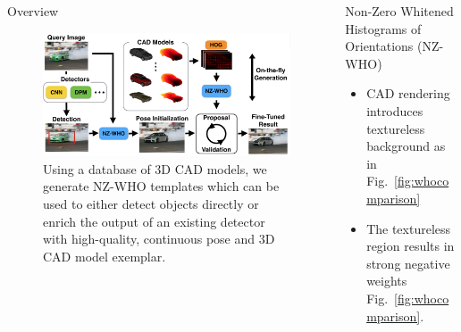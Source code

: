 \documentclass[serif,mathserif,final]{beamer}
\newcommand{\1}{\mathbb{I}} %
\begin{document}
\begin{frame}{}
\begin{columns}[t]
\begin{column}{0.24\linewidth}
      \begin{block}{Overview}
        \begin{figure}[t]
          \centering
          \includegraphics[width=0.95\linewidth]{front} %
          \caption{\normalfont Using a database of 3D CAD models, we generate NZ-WHO
            templates which can be used to either detect objects directly or
            enrich the output of an existing detector with high-quality,
            continuous pose and 3D CAD model exemplar.}
          \label{fig:front}
        \end{figure}

      \end{block}


    \end{column}%



    \begin{column}{0.24\linewidth}


      \begin{block}{Non-Zero Whitened Histograms of Orientations (NZ-WHO)}
        \vspace{-1.0em}
        \begin{itemize}
          \item CAD rendering introduces textureless background as in
            Fig.~\ref{fig:whocomparison}
          \item The textureless region results in strong negative
            weights Fig.~\ref{fig:whocomparison}.


\end{itemize}
\end{block}
\end{column}
\end{columns}
\end{frame}
\end{document}
